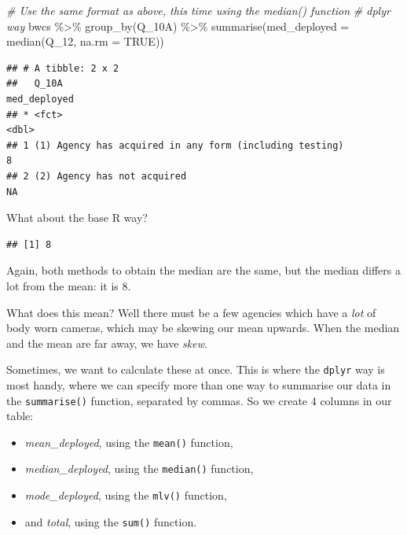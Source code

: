 \documentclass[
]{book}
\newenvironment{Shaded}{\begin{snugshade}}{\end{snugshade}}
\newcommand{\AttributeTok}[1]{\textcolor[rgb]{0.77,0.63,0.00}{#1}}
\newcommand{\CommentTok}[1]{\textcolor[rgb]{0.56,0.35,0.01}{\textit{#1}}}
\newcommand{\ConstantTok}[1]{\textcolor[rgb]{0.00,0.00,0.00}{#1}}
\newcommand{\FunctionTok}[1]{\textcolor[rgb]{0.00,0.00,0.00}{#1}}
\newcommand{\NormalTok}[1]{#1}
\newcommand{\SpecialCharTok}[1]{\textcolor[rgb]{0.00,0.00,0.00}{#1}}
\providecommand{\tightlist}{%
  \setlength{\itemsep}{0pt}\setlength{\parskip}{0pt}}
\begin{document}
\begin{Shaded}
\begin{Highlighting}[]
\CommentTok{\# Use the same format as above, this time using the median() function }
\CommentTok{\# dplyr way }
\NormalTok{bwcs }\SpecialCharTok{\%\textgreater{}\%} \FunctionTok{group\_by}\NormalTok{(Q\_10A) }\SpecialCharTok{\%\textgreater{}\%} \FunctionTok{summarise}\NormalTok{(}\AttributeTok{med\_deployed =} \FunctionTok{median}\NormalTok{(Q\_12, }\AttributeTok{na.rm =} \ConstantTok{TRUE}\NormalTok{))}
\end{Highlighting}
\end{Shaded}

\begin{verbatim}
## # A tibble: 2 x 2
##   Q_10A                                                   med_deployed
## * <fct>                                                          <dbl>
## 1 (1) Agency has acquired in any form (including testing)            8
## 2 (2) Agency has not acquired                                       NA
\end{verbatim}

What about the base R way?

\begin{Shaded}
\end{Shaded}

\begin{verbatim}
## [1] 8
\end{verbatim}

Again, both methods to obtain the median are the same, but the median differs a lot from the mean: it is 8.

What does this mean? Well there must be a few agencies which have a \emph{lot} of body worn cameras, which may be skewing our mean upwards. When the median and the mean are far away, we have \emph{skew}.

Sometimes, we want to calculate these at once. This is where the \texttt{dplyr} way is most handy, where we can specify more than one way to summarise our data in the \texttt{summarise()} function, separated by commas. So we create 4 columns in our table:

\begin{itemize}
\tightlist
\item
  \emph{mean\_deployed}, using the \texttt{mean()} function,
\item
  \emph{median\_deployed}, using the \texttt{median()} function,
\item
  \emph{mode\_deployed}, using the \texttt{mlv()} function,
\item
  and \emph{total}, using the \texttt{sum()} function.
\end{itemize}
\end{document}
